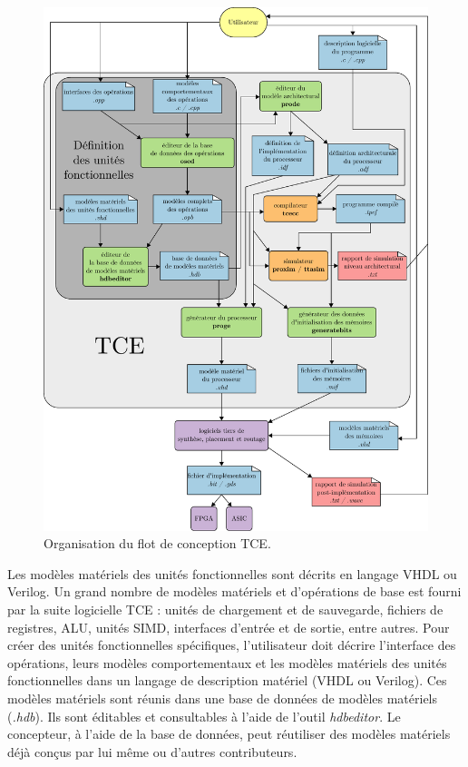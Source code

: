 \begin{figure}[htp]
\centering
\includegraphics[width=\textwidth]{main/ch4_fig/tce}
\caption{Organisation du flot de conception TCE.}
\label{fig:tce}
\end{figure}
Les modèles matériels des unités fonctionnelles sont décrits en langage VHDL ou Verilog. Un grand nombre de modèles matériels et d'opérations de base est fourni par la suite logicielle TCE : unités de chargement et de sauvegarde, fichiers de registres, ALU, unités SIMD, interfaces d'entrée et de sortie, entre autres. Pour créer des unités fonctionnelles spécifiques, l'utilisateur doit décrire l'interface des opérations, leurs modèles comportementaux et les modèles matériels des unités fonctionnelles dans un langage de description matériel (VHDL ou Verilog). Ces modèles matériels sont réunis dans une base de données de modèles matériels (\textit{.hdb}). Ils sont éditables et consultables à l'aide de l'outil \textit{hdbeditor}.
Le concepteur, à l'aide de la base de données, peut réutiliser des modèles matériels déjà conçus par lui même ou d'autres contributeurs.

